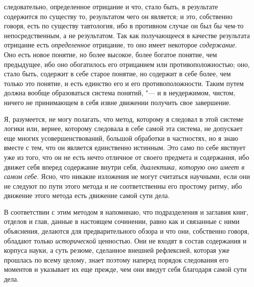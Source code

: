 следовательно, определенное отрицание и что, стало быть, в результате
содержится по существу то, результатом чего он является; и это, собственно
говоря, есть по существу тавтология, ибо в противном случае он был бы
чем-то непосредственным, а не результатом. Так как получающееся в качестве
результата отрицание есть {\em определенное} отрицание,
то оно имеет некоторое {\em содержание}. Оно есть новое
понятие, но более высокое, более богатое понятие, чем предыдущее, ибо оно
обогатилось его отрицанием или противоположностью; оно, стало быть,
содержит в себе старое понятие, но содержит в себе более, чем только это
понятие, и есть единство его и его противоположности. Таким путем должна
вообще образоваться система понятий, "--- и в неудержимом, чистом, ничего не
принимающем в себя извне движении получить свое завершение.

Я, разумеется, не могу полагать, что метод, которому я следовал в этой
системе логики или, вернее, которому следовала в себе самой эта система, не
допускает еще многих усовершенствований, большой обработки в частностях, но
я знаю вместе с тем, что он является единственно истинным. Это само по себе
явствует уже из того, что он не есть нечто отличное от своего предмета и
содержания, ибо движет себя вперед содержание внутри себя,
{\em диалектика, которую оно имеет в самом себе}. Ясно,
что никакие изложения не могут считаться научными, если они не следуют по
пути этого метода и не соответственны его простому ритму, ибо движение
этого метода есть движение самой сути дела.

В соответствии с этим методом я напоминаю, что подразделения и заглавия
книг, отделов и глав, данные в настоящем сочинении, равно как и связанные с
ними объяснения, делаются для предварительного обзора и что они, собственно
говоря, обладают только {\em исторической} ценностью.
Они не входят в состав содержания и корпуса науки, а суть резюме, сделанное
внешней рефлексией, которая уже прошлась по всему целому, знает поэтому
наперед порядок следования его моментов и указывает их еще прежде, чем они
введут себя благодаря самой сути дела.

